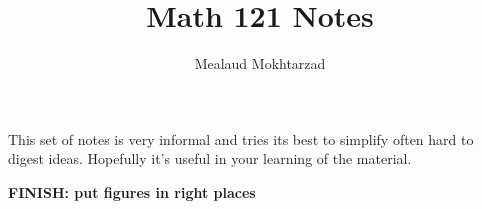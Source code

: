 \documentclass{article}
\title{Math 121 Notes}
\author{Mealaud Mokhtarzad}
\date{}
\begin{document}
\maketitle

This set of notes is very informal and tries its best to simplify often hard to digest ideas. Hopefully it's useful in your learning of the material.

\textbf{FINISH: put figures in right places}

\newpage

\renewcommand{\headrulewidth}{0pt}
\tableofcontents
\newpage

\renewcommand{\headrulewidth}{0.4pt}


\newpage

\end{document}
